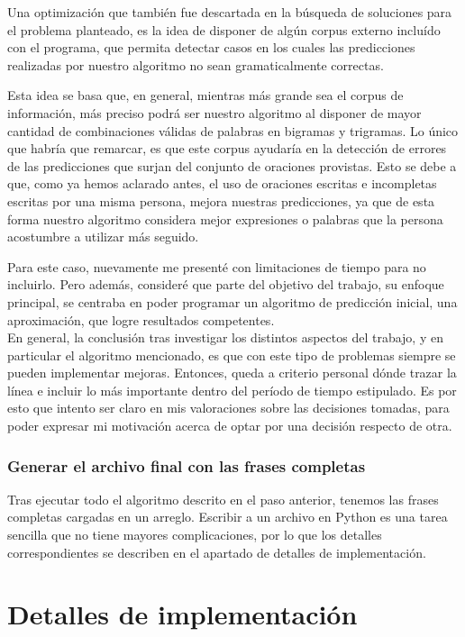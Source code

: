 \documentclass[a4paper]{article}
\begin{document}
Una optimización que también fue descartada en la búsqueda de soluciones para el problema planteado, es la idea de disponer de algún corpus externo incluído con el programa, que permita detectar casos en los cuales las predicciones realizadas por nuestro algoritmo no sean gramaticalmente correctas.

Esta idea se basa que, en general, mientras más grande sea el corpus de información, más preciso podrá ser nuestro algoritmo al disponer de mayor cantidad de combinaciones válidas de palabras en bigramas y trigramas. Lo único que habría que remarcar, es que este corpus ayudaría en la detección de errores de las predicciones que surjan del conjunto de oraciones provistas. Esto se debe a que, como ya hemos aclarado antes, el uso de oraciones escritas e incompletas escritas por una misma persona, mejora nuestras predicciones, ya que de esta forma nuestro algoritmo considera mejor expresiones o palabras que la persona acostumbre a utilizar más seguido.

Para este caso, nuevamente me presenté con limitaciones de tiempo para no incluirlo. Pero además, consideré que parte del objetivo del trabajo, su enfoque principal, se centraba en poder programar un algoritmo de predicción inicial, una aproximación, que logre resultados competentes. \\

En general, la conclusión tras investigar los distintos aspectos del trabajo, y en particular el algoritmo mencionado, es que con este tipo de problemas siempre se pueden implementar mejoras. Entonces, queda a criterio personal dónde trazar la línea e incluir lo más importante dentro del período de tiempo estipulado. Es por esto que intento ser claro en mis valoraciones sobre las decisiones tomadas, para poder expresar mi motivación acerca de optar por una decisión respecto de otra.

\subsubsection{Generar el archivo final con las frases completas}

Tras ejecutar todo el algoritmo descrito en el paso anterior, tenemos las frases completas cargadas en un arreglo. Escribir a un archivo en Python es una tarea sencilla que no tiene mayores complicaciones, por lo que los detalles correspondientes se describen en el apartado de detalles de implementación.

\section{Detalles de implementación}
\end{document}
